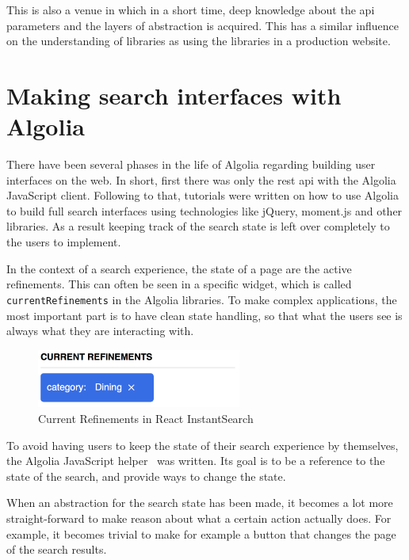 This is also a venue in which in a short time, deep knowledge about the \acrshort{api} parameters and the layers of abstraction is acquired. This has a similar influence on the understanding of libraries as using the libraries in a production website.

\section{Making search interfaces with Algolia} %
\label{sec:making_search_interfaces_with_algolia}

There have been several phases in the life of Algolia regarding building user interfaces on the web. In short, first there was only the \acrshort{rest} \acrshort{api} with the Algolia JavaScript client. Following to that, tutorials were written on how to use Algolia to build full search interfaces using technologies like jQuery, moment.js and other libraries. As a result keeping track of the search state is left over completely to the users to implement.

In the context of a search experience, the state of a page are the active refinements. This can often be seen in a specific widget, which is called {\tt currentRefinements} in the Algolia libraries. To make complex applications, the most important part is to have clean state handling, so that what the users see is always what they are interacting with.

\begin{figure}[H]
  \centering
  \includegraphics[width=0.6\textwidth]{../assets/current-refinements.png}
  \caption{Current Refinements in React InstantSearch\cite{ris-storybooks}}
  \label{figure:current-refinements}
\end{figure}

To avoid having users to keep the state of their search experience by themselves, the Algolia JavaScript helper~\cite{algolia-js-helper} was written. Its goal is to be a reference to the state of the search, and provide ways to change the state.

When an abstraction for the search state has been made, it becomes a lot more straight-forward to make reason about what a certain action actually does. For example, it becomes trivial to make for example a button that changes the page of the search results.


